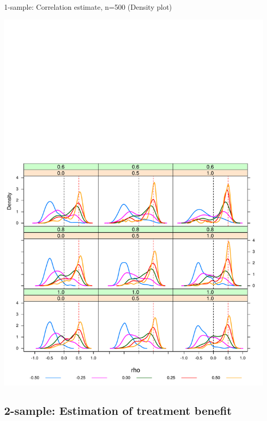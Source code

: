 \begin{frame}{1-sample: Correlation estimate, n=500 (Density plot)}

\begin{center}
  \includegraphics[trim= 0cm 0cm 0cm 11.75cm, clip, scale=0.47]{Figure1/tbl1densityPlot_n500.pdf} %
\end{center}

\end{frame}

\subsection{2-sample: Estimation of treatment benefit}
\protect\hypertarget{two-samples}{}

